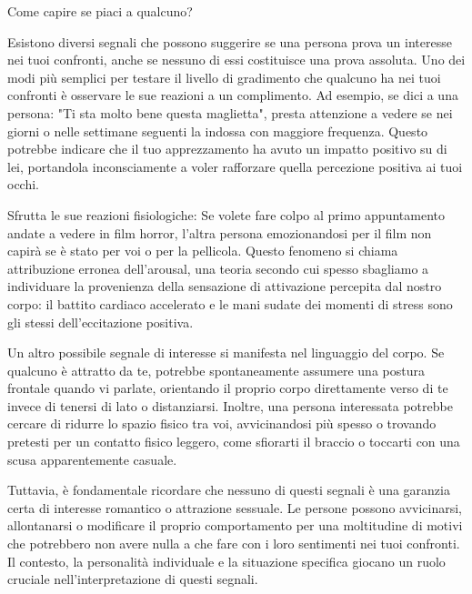 \documentclass[12pt]{book} %
\begin{document}
\begin{mdframed}[linewidth=1pt]
Come capire se piaci a qualcuno?

Esistono diversi segnali che possono suggerire se una persona prova un interesse nei tuoi confronti, anche se nessuno di essi costituisce una prova assoluta. Uno dei modi più semplici per testare il livello di gradimento che qualcuno ha nei tuoi confronti è osservare le sue reazioni a un complimento. Ad esempio, se dici a una persona: "Ti sta molto bene questa maglietta", presta attenzione a vedere se nei giorni o nelle settimane seguenti la indossa con maggiore frequenza. Questo potrebbe indicare che il tuo apprezzamento ha avuto un impatto positivo su di lei, portandola inconsciamente a voler rafforzare quella percezione positiva ai tuoi occhi.

Sfrutta le sue reazioni fisiologiche: Se volete fare colpo al primo appuntamento andate a vedere in film horror,
l'altra persona emozionandosi per il film non capirà se è stato per voi o per la pellicola. Questo fenomeno si chiama
attribuzione erronea dell'arousal, una teoria secondo cui spesso sbagliamo a individuare la provenienza della
sensazione di attivazione percepita dal nostro corpo: il battito cardiaco accelerato e le mani sudate dei momenti di
stress sono gli stessi dell'eccitazione positiva.

Un altro possibile segnale di interesse si manifesta nel linguaggio del corpo. Se qualcuno è attratto da te, potrebbe spontaneamente assumere una postura frontale quando vi parlate, orientando il proprio corpo direttamente verso di te invece di tenersi di lato o distanziarsi. Inoltre, una persona interessata potrebbe cercare di ridurre lo spazio fisico tra voi, avvicinandosi più spesso o trovando pretesti per un contatto fisico leggero, come sfiorarti il braccio o toccarti con una scusa apparentemente casuale.

Tuttavia, è fondamentale ricordare che nessuno di questi segnali è una garanzia certa di interesse romantico o attrazione sessuale. Le persone possono avvicinarsi, allontanarsi o modificare il proprio comportamento per una moltitudine di motivi che potrebbero non avere nulla a che fare con i loro sentimenti nei tuoi confronti. Il contesto, la personalità individuale e la situazione specifica giocano un ruolo cruciale nell’interpretazione di questi segnali.
\end{mdframed}
\end{document}
